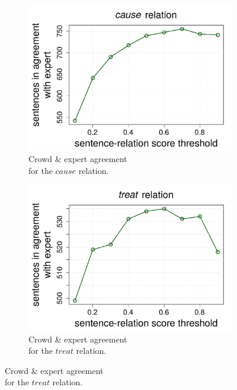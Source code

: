 \begin{figure}[htb!]
\centering
\begin{subfigure}{.5\textwidth}
\includegraphics[width=\linewidth]{img/cause_expert_agr.pdf}
\caption{Crowd \& expert agreement \\ for the $cause$ relation.}
\label{fig:cause_crowd_exp_agr}
\end{subfigure}%
\begin{subfigure}{.5\textwidth}
\includegraphics[width=\linewidth]{img/treats_expert_agr.pdf}
\caption{Crowd \& expert agreement \\ for the $treat$ relation.}
\label{fig:treat_crowd_exp_agr}
\end{subfigure}
\end{figure}

